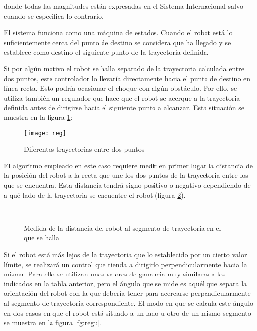 donde todas las magnitudes están expresadas en el Sistema Internacional salvo cuando se especifica lo contrario.

El sistema funciona como una máquina de estados. Cuando el robot está lo suficientemente cerca del punto de destino se considera que ha llegado y se establece como destino el siguiente punto de la trayectoria definida.

Si por algún motivo el robot se halla separado de la trayectoria calculada entre dos puntos, este controlador lo llevaría directamente hacia el punto de destino en línea recta. Esto podría ocasionar el choque con algún obstáculo. Por ello, se utiliza también un regulador que hace que el robot se acerque a la trayectoria definida antes de dirigirse hacia el siguiente punto a alcanzar. Esta situación se muestra en la figura \ref{fg:reg}:

\begin{figure}[h]
  \centering\texttt{[image: reg]}\\
  \caption{Diferentes trayectorias entre dos puntos}\label{fg:reg}
\end{figure}

El algoritmo empleado en este caso requiere medir en primer lugar la distancia de la posición del robot a la recta que une los dos puntos de la trayectoria entre los que se encuentra. Esta distancia tendrá signo positivo o negativo dependiendo de a qué lado de la trayectoria se encuentre el robot (figura \ref{fg:dist2tray}).

\begin{figure}[h]
    \\
  \caption{ Medida de la distancia del robot al segmento de trayectoria en el que se halla}\label{fg:dist2tray}
\end{figure}

\clearpage
Si el robot está más lejos de la trayectoria que lo establecido por un cierto valor límite, se realizará un control que tienda a dirigirlo perpendicularmente hacia la misma. Para ello se utilizan unos valores de ganancia muy similares a los indicados en la tabla anterior, pero el ángulo que se mide es aquél que separa la orientación del robot con la que debería tener para acercarse perpendicularmente al segmento de trayectoria correspondiente. El modo en que se calcula este ángulo en dos casos en que el robot está situado a un lado u otro de un mismo segmento se muestra en la figura \ref{fg:regu}.

